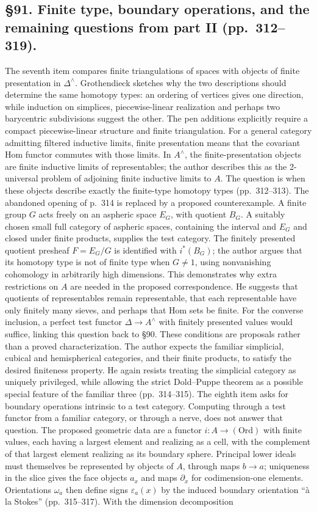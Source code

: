 \documentclass[10pt,oneside]{book}
\begin{document}
\subsection*{\S91. Finite type, boundary operations, and the remaining questions from part II (pp.\ 312--319).}
The seventh item compares finite triangulations of spaces with objects of finite presentation in $\Delta^\wedge$. Grothendieck sketches why the two descriptions should determine the same homotopy types: an ordering of vertices gives one direction, while induction on simplices, piecewise-linear realization and perhaps two barycentric subdivisions suggest the other. The pen additions explicitly require a compact piecewise-linear structure and finite triangulation. For a general category admitting filtered inductive limits, finite presentation means that the covariant Hom functor commutes with those limits. In $A^\wedge$, the finite-presentation objects are finite inductive limits of representables; the author describes this as the 2-universal problem of adjoining finite inductive limits to $A$. The question is when these objects describe exactly the finite-type homotopy types (pp.\ 312--313). The abandoned opening of p.\ 314 is replaced by a proposed counterexample. A finite group $G$ acts freely on an aspheric space $E_G$, with quotient $B_G$. A suitably chosen small full category of aspheric spaces, containing the interval and $E_G$ and closed under finite products, supplies the test category. The finitely presented quotient presheaf $F=E_G/G$ is identified with $i^*(B_G)$; the author argues that its homotopy type is not of finite type when $G\ne1$, using nonvanishing cohomology in arbitrarily high dimensions. This demonstrates why extra restrictions on $A$ are needed in the proposed correspondence. He suggests that quotients of representables remain representable, that each representable have only finitely many sieves, and perhaps that Hom sets be finite. For the converse inclusion, a perfect test functor $\Delta\to A^\wedge$ with finitely presented values would suffice, linking this question back to \S90. These conditions are proposals rather than a proved characterization. The author expects the familiar simplicial, cubical and hemispherical categories, and their finite products, to satisfy the desired finiteness property. He again resists treating the simplicial category as uniquely privileged, while allowing the strict Dold--Puppe theorem as a possible special feature of the familiar three (pp.\ 314--315). The eighth item asks for boundary operations intrinsic to a test category. Computing through a test functor from a familiar category, or through a nerve, does not answer that question. The proposed geometric data are a functor $i:A\to(\mathrm{Ord})$ with finite values, each having a largest element and realizing as a cell, with the complement of that largest element realizing as its boundary sphere. Principal lower ideals must themselves be represented by objects of $A$, through maps $b\to a$; uniqueness in the slice gives the face objects $a_x$ and maps $\partial_x$ for codimension-one elements. Orientations $\omega_a$ then define signs $\varepsilon_a(x)$ by the induced boundary orientation “à la Stokes” (pp.\ 315--317). With the dimension decomposition 
\end{document}
